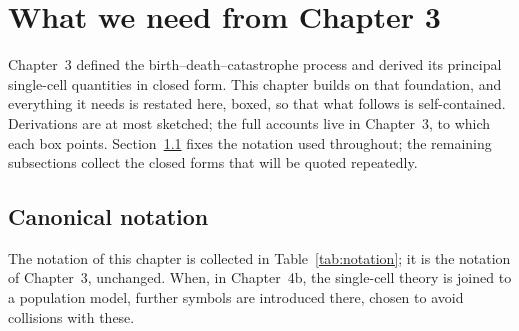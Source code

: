 
\section{What we need from Chapter 3}
\label{sec:recap}

Chapter~3 defined the birth--death--catastrophe process and derived its
principal single-cell quantities in closed form. This chapter builds on that
foundation, and everything it needs is restated here, boxed, so that what
follows is self-contained. Derivations are at most sketched; the full
accounts live in Chapter~3, to which each box points.
Section~\ref{sec:notation-tab} fixes the notation used throughout; the
remaining subsections collect the closed forms that will be quoted
repeatedly.

\subsection{Canonical notation}
\label{sec:notation-tab}

The notation of this chapter is collected in Table~\ref{tab:notation}; it is
the notation of Chapter~3, unchanged. When, in Chapter~4b, the single-cell
theory is joined to a population model, further symbols are introduced
there, chosen to avoid collisions with these.

